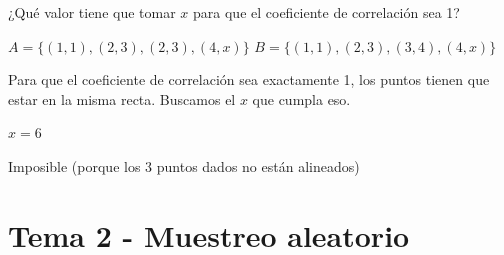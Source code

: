 \begin{problem}[10]
¿Qué valor tiene que tomar $x$ para que el coeficiente de correlación sea 1?

\ppart $A = \{(1,1),(2,3),(2,3),(4,x)\}$
\ppart $B = \{(1,1),(2,3),(3,4),(4,x)\}$

\solution

Para que el coeficiente de correlación sea exactamente 1, los puntos tienen que estar en la misma recta. Buscamos el $x$ que cumpla eso.

\spart $x=6$

\spart Imposible (porque los 3 puntos dados no están alineados)

\end{problem}

\section{Tema 2 - Muestreo aleatorio}

